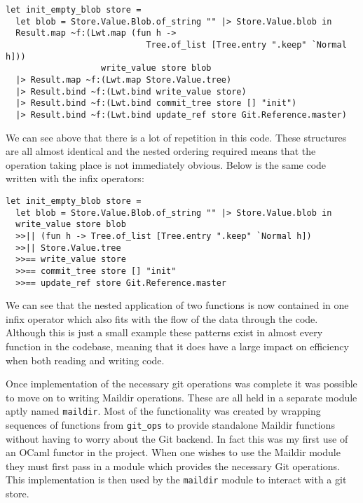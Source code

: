 \begin{verbatim}
let init_empty_blob store =
  let blob = Store.Value.Blob.of_string "" |> Store.Value.blob in
  Result.map ~f:(Lwt.map (fun h ->
                            Tree.of_list [Tree.entry ".keep" `Normal h]))
                   write_value store blob
  |> Result.map ~f:(Lwt.map Store.Value.tree)
  |> Result.bind ~f:(Lwt.bind write_value store)
  |> Result.bind ~f:(Lwt.bind commit_tree store [] "init")
  |> Result.bind ~f:(Lwt.bind update_ref store Git.Reference.master)
\end{verbatim}

We can see above that there is a lot of repetition in this code. These structures are all almost identical and the nested ordering required means that the operation taking place is not immediately obvious. Below is the same code written with the infix operators:

\begin{verbatim}
let init_empty_blob store =
  let blob = Store.Value.Blob.of_string "" |> Store.Value.blob in
  write_value store blob
  >>|| (fun h -> Tree.of_list [Tree.entry ".keep" `Normal h])
  >>|| Store.Value.tree
  >>== write_value store
  >>== commit_tree store [] "init"
  >>== update_ref store Git.Reference.master
\end{verbatim}

We can see that the nested application of two functions is now contained in one infix operator which also fits with the flow of the data through the code. Although this is just a small example these patterns exist in almost every function in the codebase, meaning that it does have a large impact on efficiency when both reading and writing code.

Once implementation of the necessary git operations was complete it was possible to move on to writing Maildir operations. These are all held in a separate module aptly named \texttt{maildir}. Most of the functionality was created by wrapping sequences of functions from \texttt{git\_ops} to provide standalone Maildir functions without having to worry about the Git backend. In fact this was my first use of an OCaml functor in the project. When one wishes to use the Maildir module they must first pass in a module which provides the necessary Git operations. This implementation is then used by the \texttt{maildir} module to interact with a git store.

